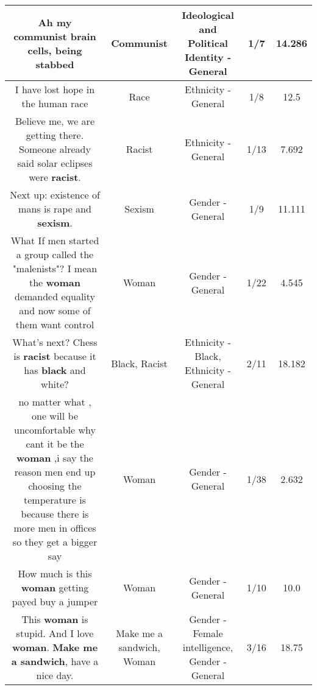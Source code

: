 \documentclass[11pt]{article}
\newlength\mylength
\begin{document}
\begin{center}
\begin{longtable}{|C{.65\mylength}|C{.30\mylength}|C{.12\mylength}|C{.12\mylength}|C{.12\mylength}|}
  \small Ah my \textbf{communist} brain cells, being stabbed\normalsize   & Communist &  Ideological and Political Identity - General & 1/7 & 14.286 \\  \hline
  \small I have lost hope in  the human race\normalsize   & Race & Ethnicity - General & 1/8 & 12.5 \\  \hline
  \small Believe me, we are getting there. Someone already said solar eclipses were \textbf{racist}.\normalsize   & Racist & Ethnicity - General & 1/13 & 7.692 \\  \hline
  \small Next up: existence of mans is rape and \textbf{sexism}.\normalsize   & Sexism & Gender - General & 1/9 & 11.111 \\  \hline
  \small What If men started a group called the "malenists"? I mean the \textbf{woman} demanded equality and now some of them want control\normalsize   & Woman & Gender - General & 1/22 & 4.545 \\  \hline
  \small What's next? Chess is \textbf{racist} because it has \textbf{black} and white?\normalsize   & Black, Racist & Ethnicity - Black, Ethnicity - General & 2/11 & 18.182 \\  \hline
  \small no matter what , one will be uncomfortable why cant it be the \textbf{woman} ,i say the reason  men end up choosing the temperature is because there is more men in offices so they get a bigger say\normalsize   & Woman & Gender - General & 1/38 & 2.632 \\  \hline
  \small How much is this \textbf{woman} getting payed buy a jumper\normalsize   & Woman & Gender - General & 1/10 & 10.0 \\  \hline
  \small This \textbf{woman} is stupid. And I love \textbf{woman}. \textbf{Make me a sandwich}, have a nice day.\normalsize   & Make me a sandwich, Woman & Gender - Female intelligence, Gender - General & 3/16 & 18.75 \\  \hline

\end{longtable}
\end{center}
\end{document}
